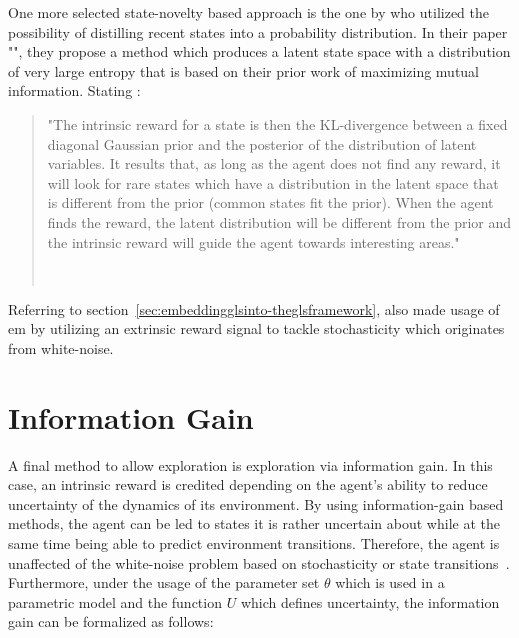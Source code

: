 \documentclass[draft,final]{vutinfth} %
\newcommand{\p}[1]{see p. #1}
\begin{document}
    One more selected state-novelty based approach is the one by \citet{kim_curiosity-bottleneck_2019-1} who utilized the possibility of distilling recent states into a probability distribution.
    In their paper "", they propose a method which produces a latent state space with a distribution of very large entropy that is based on their prior work of maximizing mutual information.
    Stating \citeauthor{aubret_survey_2019}:

    \begin{quote}
        "The intrinsic reward for a state is then the KL-divergence between a fixed diagonal Gaussian prior and the posterior of the distribution of latent variables.
        It results that, as long as the agent does not find any reward, it will look for rare states which have a distribution in the latent space that is different from the prior (common states fit the prior).
        When the agent finds the reward, the latent distribution will be different from the prior and the intrinsic reward will guide the agent towards interesting areas."

        \hfill~\cite[\p{12}]{aubret_survey_2019}
    \end{quote}

    Referring to section~\ref{sec:embeddingglsinto-theglsframework}, \citet{kim_curiosity-bottleneck_2019-1} also made usage of \gls{em} by utilizing an extrinsic reward signal to tackle stochasticity which originates from white-noise.


    \section{Information Gain}\label{sec:information-gain}

    A final method to allow exploration is exploration via information gain.
    In this case, an intrinsic reward is credited depending on the agent's ability to reduce uncertainty of the dynamics of its environment.
    By using information-gain based methods, the agent can be led to states it is rather uncertain about while at the same time being able to predict environment transitions.
    Therefore, the agent is unaffected of the white-noise problem based on stochasticity or state transitions~\citep{aubret_survey_2019}.
    Furthermore, under the usage of the parameter set $\theta$ which is used in a parametric model and the function $U$ which defines uncertainty, the information gain can be formalized as follows:
\end{document}
